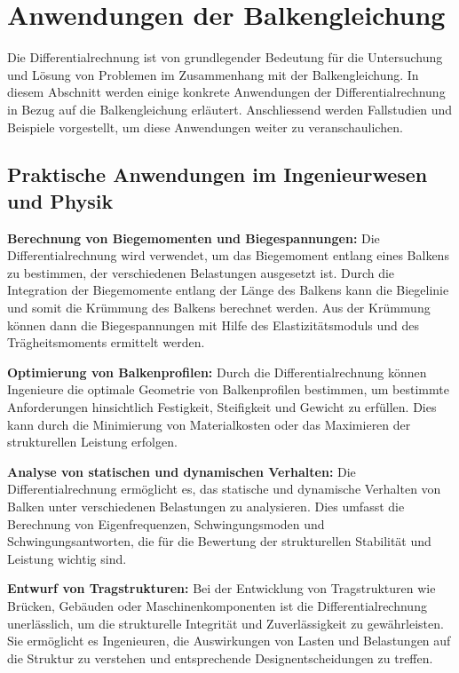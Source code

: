 %
%
%
%
\section{Anwendungen der Balkengleichung
\label{balken:section:teil3}}

Die Differentialrechnung ist von grundlegender Bedeutung für die Untersuchung und Lösung von Problemen im Zusammenhang mit der Balkengleichung. 
In diesem Abschnitt werden einige konkrete Anwendungen der Differentialrechnung in Bezug auf die Balkengleichung erläutert. 
Anschliessend werden Fallstudien und Beispiele vorgestellt, um diese Anwendungen weiter zu veranschaulichen.

\subsection{Praktische Anwendungen im Ingenieurwesen und Physik
\label{Praktische Anwendungen im Ingenieurwissenschaften und Physik}}
\textbf{ Berechnung von Biegemomenten und Biegespannungen:}
Die Differentialrechnung wird verwendet, um das Biegemoment entlang eines Balkens zu bestimmen, der verschiedenen Belastungen ausgesetzt ist. 
Durch die Integration der Biegemomente entlang der Länge des Balkens kann die Biegelinie und somit die Krümmung des Balkens berechnet werden. 
Aus der Krümmung können dann die Biegespannungen mit Hilfe des Elastizitätsmoduls und des Trägheitsmoments ermittelt werden.

\textbf{ Optimierung von Balkenprofilen:}
Durch die Differentialrechnung können Ingenieure die optimale Geometrie von Balkenprofilen bestimmen, um bestimmte Anforderungen hinsichtlich Festigkeit, Steifigkeit und Gewicht zu erfüllen. 
Dies kann durch die Minimierung von Materialkosten oder das Maximieren der strukturellen Leistung erfolgen.

\textbf{ Analyse von statischen und dynamischen Verhalten:}
Die Differentialrechnung ermöglicht es, das statische und dynamische Verhalten von Balken unter verschiedenen Belastungen zu analysieren. 
Dies umfasst die Berechnung von Eigenfrequenzen, Schwingungsmoden und Schwingungsantworten, die für die Bewertung der strukturellen Stabilität und Leistung wichtig sind.

\textbf{ Entwurf von Tragstrukturen:}
Bei der Entwicklung von Tragstrukturen wie Brücken, Gebäuden oder Maschinenkomponenten ist die Differentialrechnung unerlässlich, um die strukturelle Integrität und Zuverlässigkeit zu gewährleisten. 
Sie ermöglicht es Ingenieuren, die Auswirkungen von Lasten und Belastungen auf die Struktur zu verstehen und entsprechende Designentscheidungen zu treffen.

